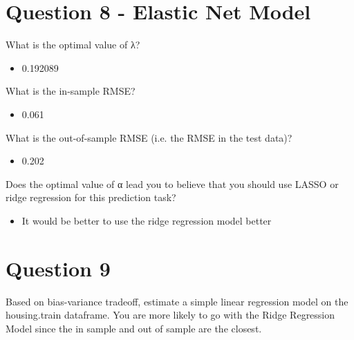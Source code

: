 \documentclass{article}
\begin{document}
\section{Question 8 - Elastic Net Model}
What is the optimal value of λ? 
\begin{itemize}
\item 0.192089
\end{itemize}
What is the in-sample RMSE?
\begin{itemize}
\item 0.061
\end{itemize}
What is the out-of-sample RMSE (i.e. the RMSE in the test data)?
\begin{itemize}
\item 0.202 
\end{itemize}
Does the optimal value of α lead you to believe that you should use LASSO or ridge regression for this prediction task?
\begin{itemize}
\item It would be better to use the ridge regression model better
\end{itemize}

\section{Question 9}
Based on bias-variance tradeoff, estimate a simple linear regression model on the housing.train dataframe. You are more likely to go with the Ridge Regression Model since the in sample and out of sample are the closest. 
\end{document}

